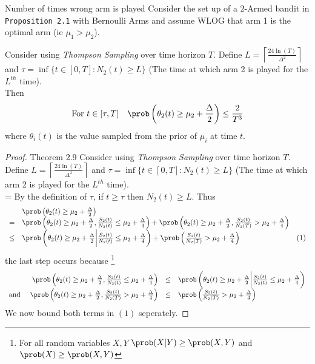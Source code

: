 \documentclass[11pt,a4paper]{article}
\begin{document}
\begin{theorem}{Number of times wrong arm is played}
  Consider the set up of a $2$-Armed bandit in \texttt{Proposition 2.1} with Bernoulli Arms and assume WLOG that arm 1 is the optimal arm (ie $\mu_1>\mu_2$).
  \par Consider using \textit{Thompson Sampling} over time horizon $T$. Define $L=\left\lceil\frac{24\ln(T)}{\Delta^2}\right\rceil$  and ${\tau=\inf\{t\in[0,T]:N_2(t)\geq L\}}$ (The time at which arm 2 is played for the $L^{th}$ time).\\ Then
  \[ \text{For }t\in[\tau,T]\quad\prob\left(\theta_2(t)\geq\mu_2+\frac\Delta2\right)\leq\frac2{T^3} \]
  where $\theta_i(t)$ is the value sampled from the prior of $\mu_i$ at time $t$.
\end{theorem}

\begin{proof}{Theorem 2.9}
  Consider using \textit{Thompson Sampling} over time horizon $T$. Define $L=\left\lceil\frac{24\ln(T)}{\Delta^2}\right\rceil$  and ${\tau=\inf\{t\in[0,T]:N_2(t)\geq L\}}$ (The time at which arm 2 is played for the $L^{th}$ time).\\
  \everymath={\displaystyle}
  By the definition of $\tau$, if $t\geq\tau$ then $N_2(t)\geq L$. Thus
  \[\begin{array}{rlll}
  &\prob\left(\theta_2(t)\geq\mu_2+\frac\Delta2\right)\\
  =&\prob\left(\theta_2(t)\geq\mu_2+\frac\Delta2,\frac{S_2(t)}{N_2(t)}\leq\mu_2+\frac\Delta4\right)+\prob\left(\theta_2(t)\geq\mu_2+\frac\Delta2,\frac{S_2(t)}{N_2(T)}>\mu_2+\frac\Delta4\right)\\
  \leq&\prob\left(\theta_2(t)\geq\mu_2+\frac\Delta2\bigg|\frac{S_2(t)}{N_2(t)}\leq\mu_2+\frac\Delta4\right)+\prob\left(\frac{S_2(t)}{N_2(T)}>\mu_2+\frac\Delta4\right)&(1)
  \end{array}\]
  the last step occurs because \footnote{For all random variables $X,Y$ $\prob(X|Y)\geq\prob(X,Y)$ and $\prob(X)\geq\prob(X,Y)$}
  \[\begin{array}{rrcl}
    &\prob\left(\theta_2(t)\geq\mu_2+\frac\Delta2,\frac{S_2(t)}{N_2(t)}\leq\mu_2+\frac\Delta4\right)&\leq&\prob\left(\theta_2(t)\geq\mu_2+\frac\Delta2\bigg|\frac{S_2(t)}{N_2(t)}\leq\mu_2+\frac\Delta4\right)\\
    \text{and }&\prob\left(\theta_2(t)\geq\mu_2+\frac\Delta2,\frac{S_2(t)}{N_2(T)}>\mu_2+\frac\Delta4\right)&\leq&\prob\left(\frac{S_2(t)}{N_2(T)}>\mu_2+\frac\Delta4\right)
  \end{array}\]
  We now bound both terms in $(1)$ seperately.

\end{proof}
\end{document}
